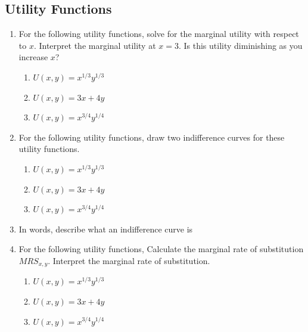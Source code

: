 \documentclass[11pt]{article}
\begin{document}
\subsection*{Utility Functions}
\begin{enumerate}
  \item For the following utility functions, solve for the marginal utility with respect to $x$. Interpret the marginal utility at $x = 3$. Is this utility diminishing as you increase $x$?
  \begin{enumerate}
    \item $U(x,y) = x^{1/3}y^{1/3}$
    \item $U(x,y) = 3x + 4y$
    \item $U(x,y) = x^{3/4}y^{1/4}$
  \end{enumerate}

  \item For the following utility functions, draw two indifference curves for these utility functions. 
  \begin{enumerate}
    \item $U(x,y) = x^{1/3}y^{1/3}$
    \item $U(x,y) = 3x + 4y$
    \item $U(x,y) = x^{3/4}y^{1/4}$
  \end{enumerate}

  \item In words, describe what an indifference curve is
  
  \item For the following utility functions, Calculate the marginal rate of substitution $MRS_{x,y}$. Interpret the marginal rate of substitution.
  \begin{enumerate}
    \item $U(x,y) = x^{1/3}y^{1/3}$
    \item $U(x,y) = 3x + 4y$
    \item $U(x,y) = x^{3/4}y^{1/4}$
  \end{enumerate}
\end{enumerate}
\end{document}
